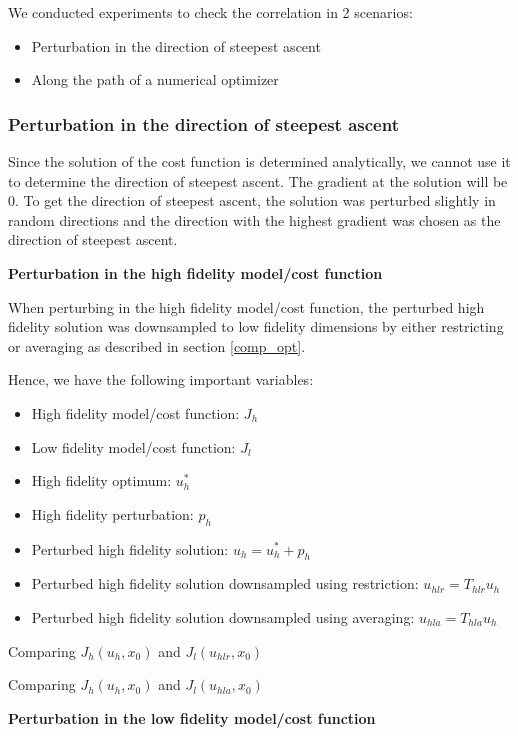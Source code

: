 \documentclass{article}
\begin{document}
We conducted experiments to check the correlation in 2 scenarios:
\begin{itemize}
  \item Perturbation in the direction of steepest ascent
  \item Along the path of a numerical optimizer
\end{itemize}

\subsubsection{Perturbation in the direction of steepest ascent}

Since the solution of the cost function is determined analytically, we cannot use it to determine the direction of steepest ascent.
The gradient at the solution will be 0. To get the direction of steepest ascent, the solution was perturbed slightly in random directions and the direction with the highest gradient
was chosen as the direction of steepest ascent.

\textbf{Perturbation in the high fidelity model/cost function}

When perturbing in the high fidelity model/cost function, the perturbed high fidelity solution was downsampled to low fidelity
dimensions by either restricting or averaging as described in section \ref{comp_opt}.

Hence, we have the following important variables:

\begin{itemize}
  \item High fidelity model/cost function: $J_h$
  \item Low fidelity model/cost function: $J_l$
  \item High fidelity optimum: $u_h^*$
  \item High fidelity perturbation: $p_h$
  \item Perturbed high fidelity solution: $u_h = u_h^* + p_h$
  \item Perturbed high fidelity solution downsampled using restriction: $u_{hlr} = T_{hlr} u_h$
  \item Perturbed high fidelity solution downsampled using averaging: $u_{hla} = T_{hla} u_h$
\end{itemize}

Comparing $J_h(u_h, x_0)$ and $J_l(u_{hlr}, x_0)$

Comparing $J_h(u_h, x_0)$ and $J_l(u_{hla}, x_0)$

\textbf{Perturbation in the low fidelity model/cost function}
\end{document}
